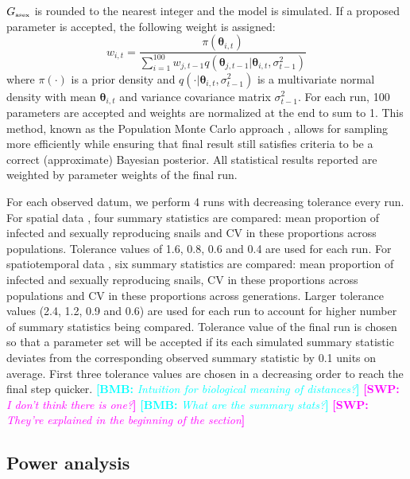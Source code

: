 \documentclass{article}\usepackage[]{graphicx}\usepackage[]{color}
\newcommand{\comment}[3]{\textcolor{#1}{\textbf{[#2: }\textit{#3}\textbf{]}}}
\newcommand{\bmb}[1]{\comment{cyan}{BMB}{#1}}
\newcommand{\swp}[1]{\comment{magenta}{SWP}{#1}}
\begin{document}
$G_{\textrm{\tiny asex}}$ is rounded to the nearest integer and the model is simulated.
If a proposed parameter is accepted, the following weight is assigned:
$$
w_{i,t} = \frac{\pi(\bm\theta_{i, t})}{\sum_{i=1}^{100} w_{j, t-1} q(\bm\theta_{j, t-1} | \bm\theta_{i,t}, \sigma_{t-1}^2)}
$$
where $\pi(\cdot)$ is a prior density and $q(\cdot | \bm\theta_{i,t}, \sigma_{t-1}^2)$ is a multivariate normal density with mean $\bm\theta_{i,t}$ and variance covariance matrix $\sigma_{t-1}^2$.
For each run, 100 parameters are accepted and weights are normalized at the end to sum to 1.
This method, known as the Population Monte Carlo approach \citep{turner2012tutorial}, allows for sampling more efficiently while ensuring that final result still satisfies criteria to be a correct (approximate) Bayesian posterior.
All statistical results reported are weighted by parameter weights of the final run.

For each observed datum, we perform 4 runs with decreasing tolerance every run.
For spatial data \citep{dagan2013clonal, mckone2016fine}, four summary statistics are compared: mean proportion of infected and sexually reproducing snails and CV in these proportions across populations.
Tolerance values of 1.6, 0.8, 0.6 and 0.4 are used for each run.
For spatiotemporal data \citep{vergara2014infection}, six summary statistics are compared: mean proportion of infected and sexually reproducing snails, CV in these proportions across populations and CV in these proportions across generations.
Larger tolerance values (2.4, 1.2, 0.9 and 0.6) are used for each run to account for higher number of summary statistics being compared.
Tolerance value of the final run is chosen so that a parameter set will be accepted if its each simulated summary statistic deviates from the corresponding observed summary statistic by 0.1 units on average.
First three tolerance values are chosen in a decreasing order to reach the final step quicker.
\bmb{Intuition for biological meaning of distances?}
\swp{I don't think there is one?}
\bmb{What are the summary stats?}
\swp{They're explained in the beginning of the section}

\subsection{Power analysis}
\end{document}
